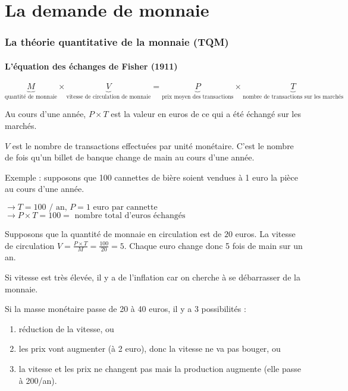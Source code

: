 \part{La demande de monnaie}

\section{La théorie quantitative de la monnaie (TQM)}

	\subsection{L'équation des échanges de Fisher (1911)}
	
	$$\underbrace{M}_{\text{quantité de monnaie}} \times \underbrace{V}_{\text{vitesse de circulation de monnaie}} = \underbrace{P}_{\text{prix moyen des transactions}} \times \underbrace{T}_{\text{nombre de transactions sur les marchés}}$$
	
	Au cours d'une année, $P \times T$ est la valeur en euros de ce qui a été échangé sur les marchés.
	
	$V$ est le nombre de transactions effectuées par unité monétaire. C'est le nombre de fois qu'un billet de banque change de main au cours d'une année.
	
	Exemple : supposons que 100 cannettes de bière soient vendues à 1 euro la pièce au cours d'une année.
	
	$\rightarrow T = 100\text{ / an, } P = 1 \text{ euro par cannette}$
	$\rightarrow P \times T = 100 = \text{ nombre total d'euros échangés}$
	
	Supposons que la quantité de monnaie en circulation est de $20$ euros. La vitesse de circulation $V = \frac{P \times T}{M} = \frac{100}{20} = 5$. Chaque euro change donc 5 fois de main sur un an.
	
	Si vitesse est très élevée, il y a de l'inflation car on cherche à se débarrasser de la monnaie.
	
	Si la masse monétaire passe de 20 à 40 euros, il y a 3 possibilités :
	
	\begin{enumerate}
		\item réduction de la vitesse, ou
		\item les prix vont augmenter (à 2 euro), donc la vitesse ne va pas bouger, ou
		\item la vitesse et les prix ne changent pas mais la production augmente (elle passe à 200/an).
	\end{enumerate}
	
